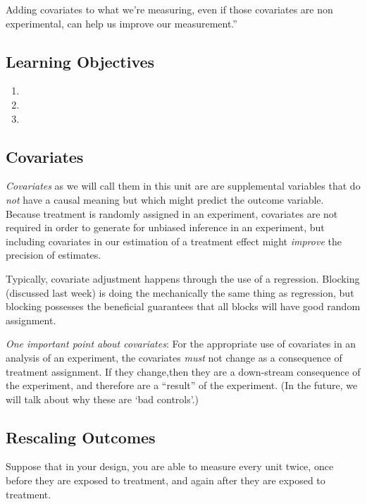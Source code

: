 \documentclass[
]{article}
\providecommand{\tightlist}{%
  \setlength{\itemsep}{0pt}\setlength{\parskip}{0pt}}
\theoremstyle{definition}
\theoremstyle{definition}
\theoremstyle{definition}
\theoremstyle{definition}
\theoremstyle{remark}
\begin{document}
Adding covariates to what we're measuring, even if those covariates are non experimental, can help us improve our
measurement.''

\subsection{Learning Objectives}\label{learning-objectives-5}

\begin{enumerate}
\def\labelenumi{\arabic{enumi}.}
\tightlist
\item
\item
\item
\end{enumerate}

\subsection{Covariates}\label{covariates}

\emph{Covariates} as we will call them in this unit are are supplemental variables that do \emph{not} have a causal meaning but which might predict the outcome variable. Because treatment is randomly assigned in an experiment, covariates are not required in order to generate for unbiased inference in an experiment, but including covariates in our estimation of a treatment effect might \emph{improve} the precision of estimates.

Typically, covariate adjustment happens through the use of a regression. Blocking (discussed last week) is doing the mechanically the same thing as regression, but blocking possesses the beneficial guarantees that all blocks will have good random assignment.

\emph{One important point about covariates}: For the appropriate use of covariates in an analysis of an experiment, the covariates \emph{must} not change as a consequence of treatment assignment. If they change,then they are a down-stream consequence of the experiment, and therefore are a ``result'' of the experiment. (In the future, we will talk about why these are `bad controls'.)

\subsection{Rescaling Outcomes}\label{rescaling-outcomes}

Suppose that in your design, you are able to measure every unit twice, once before they are exposed to treatment, and again after they are exposed to treatment.
\end{document}
